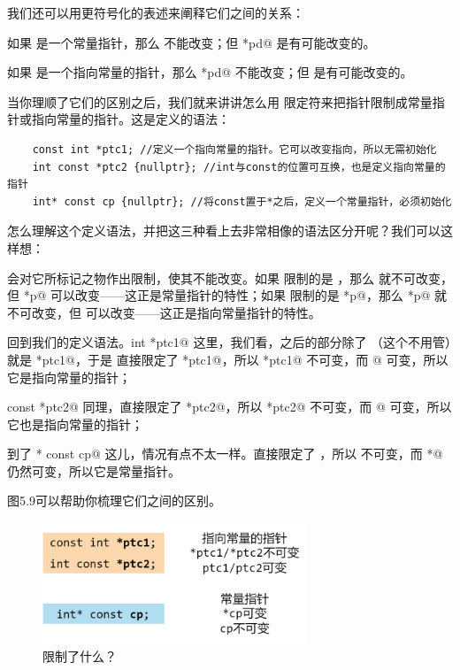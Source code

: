 我们还可以用更符号化的表述来阐释它们之间的关系：\par
如果 \lstinline@pd@ 是一个常量指针，那么 \lstinline@pd@ 不能改变；但 \lstinline@*pd@ 是有可能改变的。\par
如果 \lstinline@pd@ 是一个指向常量的指针，那么 \lstinline@*pd@ 不能改变；但 \lstinline@pd@ 是有可能改变的。\par
当你理顺了它们的区别之后，我们就来讲讲怎么用 \lstinline@const@ 限定符来把指针限制成常量指针或指向常量的指针。这是定义的语法：
\begin{lstlisting}
    const int *ptc1; //定义一个指向常量的指针。它可以改变指向，所以无需初始化
    int const *ptc2 {nullptr}; //int与const的位置可互换，也是定义指向常量的指针
    int* const cp {nullptr}; //将const置于*之后，定义一个常量指针，必须初始化
\end{lstlisting}
怎么理解这个定义语法，并把这三种看上去非常相像的语法区分开呢？我们可以这样想：\par
\lstinline@const@ 会对它所标记之物作出限制，使其不能改变。如果 \lstinline@const@ 限制的是 \lstinline@p@，那么 \lstinline@p@ 就不可改变，但 \lstinline@*p@ 可以改变——这正是常量指针的特性；如果 \lstinline@const@ 限制的是 \lstinline@*p@，那么 \lstinline@*p@ 就不可改变，但 \lstinline@p@ 可以改变——这正是指向常量指针的特性。\par
回到我们的定义语法。\lstinline@const int *ptc1@ 这里，我们看，\lstinline@const@ 之后的部分除了 \lstinline@int@（这个不用管）就是 \lstinline@*ptc1@，于是 \lstinline@const@ 直接限定了 \lstinline@*ptc1@，所以 \lstinline@*ptc1@ 不可变，而 @ 可变，所以它是指向常量的指针；\par
\lstinline@int const *ptc2@ 同理，\lstinline@const@ 直接限定了 \lstinline@*ptc2@，所以 \lstinline@*ptc2@ 不可变，而 @ 可变，所以它也是指向常量的指针；\par
到了 \lstinline@int* const cp@ 这儿，情况有点不太一样。\lstinline@const@ 直接限定了 \lstinline@cp@，所以 \lstinline@cp@ 不可变，而 \lstinline@cp*@ 仍然可变，所以它是常量指针。\par
图5.9可以帮助你梳理它们之间的区别。\par
\begin{figure}[htbp]
    \centering
    \includegraphics[width=0.7\textwidth]{../images/generalized_parts/05_definition_of_constant_pointer_and_pointer_to_const.drawio.png}
    \caption{\lstinline@const@ 限制了什么？}
\end{figure}
